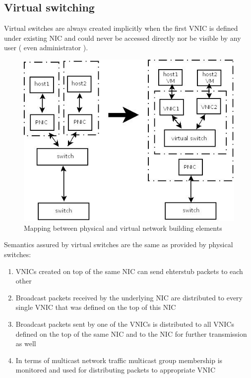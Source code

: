 \documentclass[11pt]{book}
\begin{document}
    \subsection{Virtual switching}
			
			Virtual switches are always created implicitly when the first VNIC is defined under existing NIC and could never be accessed directly nor be visible by
			any user ( even administrator ). 
			
			\begin{figure}[H]
				\includegraphics[width=\textwidth]{img/physical_and_virtual_switches_mapping.jpeg}
				\caption{Mapping between physical and virtual network building elements}
			\end{figure}
			
			Semantics assured by virtual switches are the same as provided by physical switches: 
			\begin{enumerate}
				\item{VNICs created on top of the same NIC can send ehterstub packets to each other}
				\item{Broadcast packets received by the underlying NIC are distributed to every single VNIC that was defined on the top of this NIC}
				\item{Broadcast packets sent by one of the VNICs is distributed to all VNICs defined on the top of the same NIC and to the NIC for further transmission as well}
				\item{In terms of multicast network traffic multicast group membership is monitored and used for distributing packets to appropriate VNIC}
			\end{enumerate}
\end{document}
